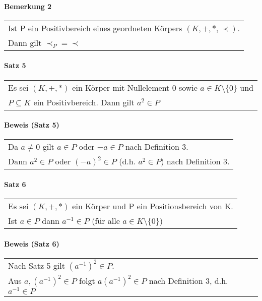 \documentclass[a4paper]{scrartcl}
\begin{document}
\paragraph{Bemerkung 2}
\begin{tabbing}
\begin{tabular}{l}
Ist P ein Positivbereich eines geordneten Körpers $(K,+,*,\prec)$.\\
Dann gilt $\prec_P = \prec$
\end{tabular}
\end{tabbing}

\paragraph{Satz 5}
\begin{tabbing}
\begin{tabular}{l}
Es sei $(K,+,*)$ ein Körper mit Nullelement 0 sowie $a\in K\setminus\{ 0\}$ und \\
$P \subseteq K$ ein Positivbereich. Dann gilt $a^2\in P$
\end{tabular}
\end{tabbing}

\paragraph{Beweis (Satz 5)}
\begin{tabbing}
\begin{tabular}{l}
Da $a\neq 0$ gilt $a\in P$ oder $-a\in P$ nach Definition 3.\\
Dann $a^2\in P$ oder $(-a)^2\in P$ (d.h. $a^2\in P$) nach Definition 3.
\end{tabular}
\end{tabbing}

\paragraph{Satz 6}
\begin{tabbing}
\begin{tabular}{l}
Es sei $(K,+,*)$ ein Körper und P ein Positionsbereich von K.\\
Ist $a\in P$ dann $a^{-1}\in P$ (für alle $a\in K\setminus\{ 0\}$)
\end{tabular}
\end{tabbing}

\paragraph{Beweis (Satz 6)}
\begin{tabbing}
\begin{tabular}{l}
Nach Satz 5 gilt $(a^{-1})^2\in P$.\\
Aus $a, (a^{-1})^2\in P$ folgt $a(a^{-1})^2\in P$ nach Definition 3, d.h. $a^{-1}\in P$\\
\end{tabular}
\end{tabbing}
\end{document}
